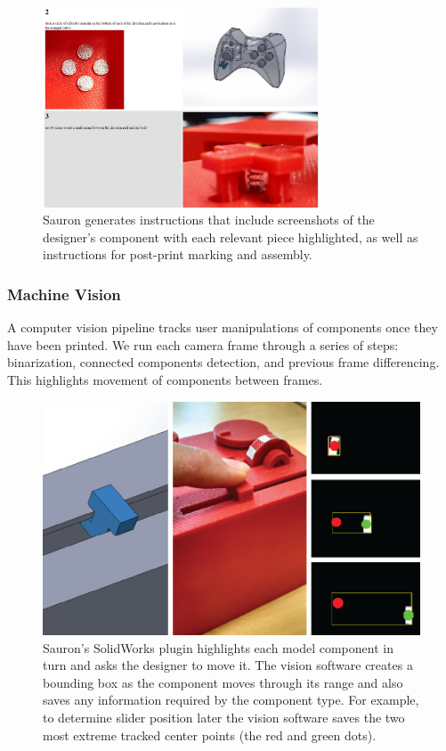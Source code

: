 \begin{figure}
\centering
\includegraphics[width=3.25in]{figures/sauron/directions.PNG}
\caption{Sauron generates instructions that include screenshots of the designer's component with each relevant piece highlighted, as well as instructions for post-print marking and assembly.}
\label{fig:sauron-instructions}
\end{figure}

\subsubsection{Machine Vision}
A computer vision pipeline tracks user manipulations of components once they have been printed.
We run each camera frame through a series of steps: binarization, connected components detection, and previous frame differencing. This highlights movement of components between frames.

\begin{figure}
\centering
\includegraphics[width=4.5in]{figures/sauron/vision-slider.png}
\caption{Sauron's SolidWorks plugin highlights each model component in turn and asks the designer to move it. The vision software creates a bounding box as the component moves through its range and also saves any information required by the component type. For example, to determine slider position later the vision software saves the two most extreme tracked center points (the red and green dots).}
\label{fig:sauron-vision-process}
\end{figure}

